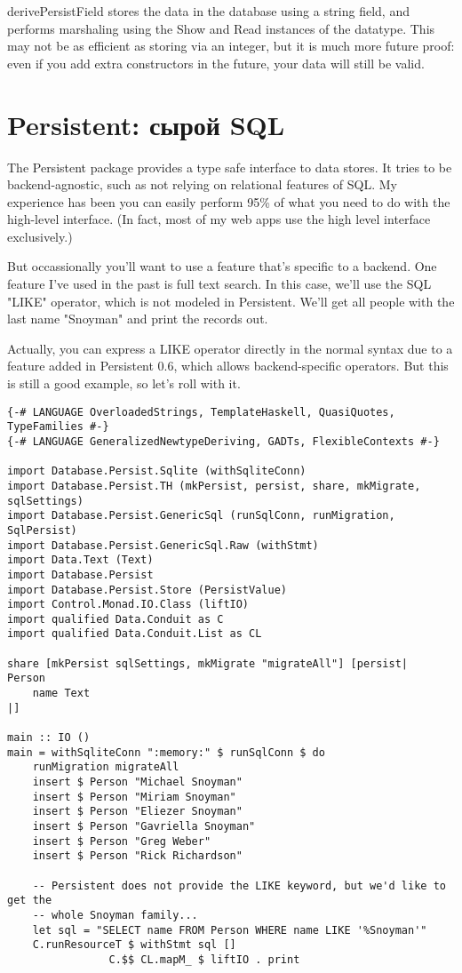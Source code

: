 derivePersistField stores the data in the database using a string field, and performs marshaling using the Show and Read instances of the datatype. This may not be as efficient as storing via an integer, but it is much more future proof: even if you add extra constructors in the future, your data will still be valid.

\section{Persistent: сырой SQL} %

The Persistent package provides a type safe interface to data stores. It tries to be backend-agnostic, such as not relying on relational features of SQL. My experience has been you can easily perform 95\% of what you need to do with the high-level interface. (In fact, most of my web apps use the high level interface exclusively.)

But occassionally you'll want to use a feature that's specific to a backend. One feature I've used in the past is full text search. In this case, we'll use the SQL "LIKE" operator, which is not modeled in Persistent. We'll get all people with the last name "Snoyman" and print the records out.

\begin{remark}
Actually, you can express a LIKE operator directly in the normal syntax due to a feature added in Persistent 0.6, which allows backend-specific operators. But this is still a good example, so let's roll with it.
\end{remark}

\begin{lstlisting}
{-# LANGUAGE OverloadedStrings, TemplateHaskell, QuasiQuotes, TypeFamilies #-}
{-# LANGUAGE GeneralizedNewtypeDeriving, GADTs, FlexibleContexts #-}

import Database.Persist.Sqlite (withSqliteConn)
import Database.Persist.TH (mkPersist, persist, share, mkMigrate, sqlSettings)
import Database.Persist.GenericSql (runSqlConn, runMigration, SqlPersist)
import Database.Persist.GenericSql.Raw (withStmt)
import Data.Text (Text)
import Database.Persist
import Database.Persist.Store (PersistValue)
import Control.Monad.IO.Class (liftIO)
import qualified Data.Conduit as C
import qualified Data.Conduit.List as CL

share [mkPersist sqlSettings, mkMigrate "migrateAll"] [persist|
Person
    name Text
|]

main :: IO ()
main = withSqliteConn ":memory:" $ runSqlConn $ do
    runMigration migrateAll
    insert $ Person "Michael Snoyman"
    insert $ Person "Miriam Snoyman"
    insert $ Person "Eliezer Snoyman"
    insert $ Person "Gavriella Snoyman"
    insert $ Person "Greg Weber"
    insert $ Person "Rick Richardson"

    -- Persistent does not provide the LIKE keyword, but we'd like to get the
    -- whole Snoyman family...
    let sql = "SELECT name FROM Person WHERE name LIKE '%Snoyman'"
    C.runResourceT $ withStmt sql []
                C.$$ CL.mapM_ $ liftIO . print
\end{lstlisting}%

